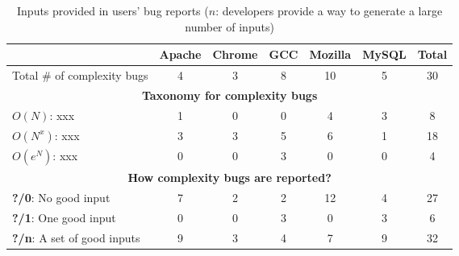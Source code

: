 \begin{table*}[tb!]
\begin{adjustwidth}{-.5in}{-.5in}
\small
\centering
{
\begin{tabular}{|lcccccc|}
\hline
                                                 &   Apache  &   Chrome   &  GCC   &    Mozilla   &   MySQL  &  Total\\
\hline
Total \# of complexity bugs                      &   4       &    3       &   8    &    10        &   5      &   30 \\
\hline
\multicolumn{7}{|c|}{\bf Taxonomy for complexity bugs}\\
\multicolumn{1}{|l}{{\bf $O(N)$}: xxx}           &   1       &    0       &   0    &    4         &   3      &   8\\
\multicolumn{1}{|l}{{\bf $O(N^x)$}: xxx}         &   3       &    3       &   5    &    6         &   1      &  18\\
\multicolumn{1}{|l}{{\bf $O(e^N)$}: xxx}         &   0       &    0       &   3    &    0         &   0      &   4\\
\hline
\multicolumn{7}{|c|}{\bf How complexity bugs are reported?}\\
\multicolumn{1}{|l}{{\bf ?/0}: No good input}
&7&2&2&12&4&27\\
\multicolumn{1}{|l}{{\bf ?/1}: One good input}
&0&0&3&0&3&6\\
\multicolumn{1}{|l}{{\bf ?/n}: A set of good inputs}
&9&3&4&7&9&32\\
\hline
\end{tabular}
}
\end{adjustwidth}
\caption{Inputs provided in users' bug reports ($n$: 
developers provide a way to generate a large number of inputs)}
\label{tab:study}
\end{table*}
